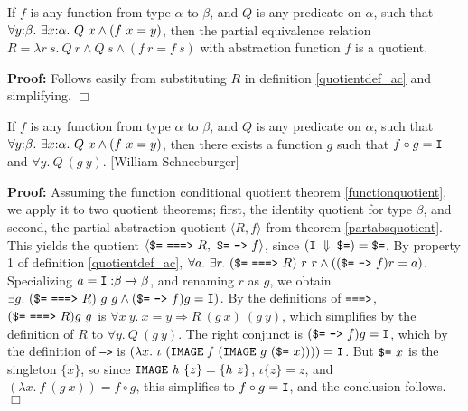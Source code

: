 \documentclass[envcountsame,runningheads]{llncs}
\begin{document}
\begin{theorem}
\label{partabsquotient}
If $f$ is any function from type $\alpha$ to $\beta$,
and
$Q$ is any predicate on $\alpha$,
such that $\forall y{\tt :}\beta.\ \exists x{\tt :}\alpha.\ Q\ x \wedge (f\ x = y)$,
then the partial equivalence relation $R = \lambda r\ s.\ Q\ r \wedge Q\ s \wedge (f\ r = f\ s)$
with abstraction function $f$ is a quotient.
\end{theorem}
{\bf Proof:}
Follows easily from substituting $R$
in definition \ref{quotientdef_ac}
and simplifying.
$\Box$

\begin{theorem}
\label{partinverses}
If $f$ is any function from type $\alpha$ to $\beta$, and $Q$ is any
predicate on $\alpha$,
such that $\forall y{\tt :}\beta.\ \exists x{\tt :}\alpha.\ Q\ x \wedge (f\ x = y)$,
then there exists a function $g$ such that
$f \circ g = {\tt I}$
and
$\forall y.\ Q\ (g\ y)$.
{\rm 
[William Schneeburger]}
\end{theorem}
{\bf Proof:}
Assuming the function conditional quotient theorem \ref{functionquotient},
we apply it to two quotient theorems;
first, the identity quotient for type $\beta$, and second,
the partial abstraction quotient $\langle R,f \rangle$
from theorem \ref{partabsquotient}.
This yields the quotient
$\langle \mbox{\tt \$=}\ \mbox{\tt ===>}\ R,\ 
 \mbox{\tt \$=}\ \mbox{\tt -->}\ f \rangle$,
since $(\mbox{\tt I $\Downarrow$ \$=}) = \mbox{\tt \$=}$.
By property 1 of definition \ref{quotientdef_ac},
$\forall a.\ \exists r.\ (\mbox{\tt \$=}\ \mbox{\tt ===>}\ R)\ r\ r \wedge
((
\mbox{\tt \$=}
\ \mbox{\tt -->}\ f) r = a)$.
Specializing $a = {\tt I:}\beta \rightarrow \beta$,
and renaming $r$ as $g$, we obtain
$\exists g.\ (\mbox{\tt \$=}\ \mbox{\tt ===>}\ R)\ g\ g \wedge
(\mbox{\tt \$=}\ \mbox{\tt -->}\ f) g = {\tt I})$.
By the definitions of $\mbox{\tt ===>}$,
$(\mbox{\tt \$=}\ \mbox{\tt ===>}\ R) g\ g$ is 
$\forall x\ y.\ x = y \Rightarrow R\ (g\ x)\ (g\ y)$,
which simplifies by the definition of $R$ to $\forall y.\ Q\ (g\ y)$.
The right conjunct is
$
(\mbox{\tt \$=}\ \mbox{\tt -->}\ f) g = {\tt I}$,
which by the definition of {\tt -->} is 
$
(\lambda x.\ 
\iota \ ({\tt IMAGE}\ {\it f}\ ({\tt IMAGE}\ g\ (\mbox{\tt \$=}\ x))))
 = {\tt I}$.
But $\mbox{\tt \$=}\ x$ is the singleton $\{x\}$,
so since ${\tt IMAGE}\ {\it h}\ \{z\} = \{h\ z\}$,
$\iota \{z\} = z$,
and $(\lambda x.\ f\ (g\ x)) = f \circ g$,
this
simplifies
to $
f \circ g = {\tt I}$,
and
the conclusion follows.
$\Box$
\end{document}
